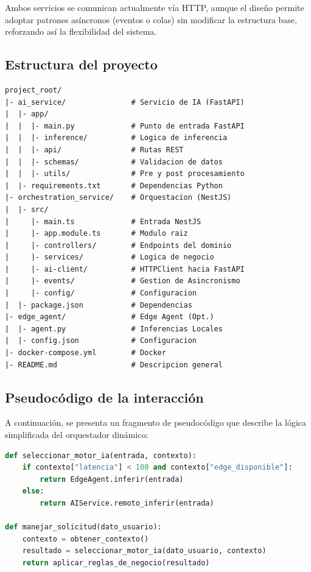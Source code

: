 \documentclass[a4paper]{llncs}
\begin{document}
Ambos servicios se comunican actualmente vía HTTP, aunque el diseño permite adoptar patrones asíncronos (eventos o colas) sin modificar la estructura base, reforzando así la flexibilidad del sistema.

\subsection*{Estructura del proyecto}


\begin{lstlisting}[basicstyle=\ttfamily, frame=single, caption={Estructura general del proyecto}]
project_root/
|- ai_service/               # Servicio de IA (FastAPI)
|  |- app/
|  |  |- main.py             # Punto de entrada FastAPI
|  |  |- inference/          # Logica de inferencia
|  |  |- api/                # Rutas REST
|  |  |- schemas/            # Validacion de datos
|  |  |- utils/              # Pre y post procesamiento
|  |- requirements.txt       # Dependencias Python
|- orchestration_service/    # Orquestacion (NestJS)
|  |- src/
|     |- main.ts             # Entrada NestJS
|     |- app.module.ts       # Modulo raiz
|     |- controllers/        # Endpoints del dominio
|     |- services/           # Logica de negocio
|     |- ai-client/          # HTTPClient hacia FastAPI
|     |- events/             # Gestion de Asincronismo
|     |- config/             # Configuracion
|  |- package.json           # Dependencias
|- edge_agent/               # Edge Agent (Opt.)
|  |- agent.py               # Inferencias Locales
|  |- config.json            # Configuracion
|- docker-compose.yml        # Docker
|- README.md                 # Descripcion general
\end{lstlisting}

\subsection*{Pseudocódigo de la interacción}

A continuación, se presenta un fragmento de pseudocódigo que describe la lógica simplificada del orquestador dinámico:

\begin{lstlisting}[language=Python, caption={Seleccion de motor IA segun contexto}]
def seleccionar_motor_ia(entrada, contexto):
    if contexto["latencia"] < 100 and contexto["edge_disponible"]:
        return EdgeAgent.inferir(entrada)
    else:
        return AIService.remoto_inferir(entrada)

def manejar_solicitud(dato_usuario):
    contexto = obtener_contexto()
    resultado = seleccionar_motor_ia(dato_usuario, contexto)
    return aplicar_reglas_de_negocio(resultado)
\end{lstlisting}
\end{document}
